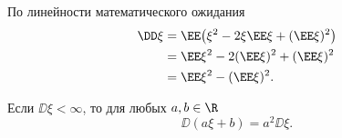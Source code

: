 \begin{Proof}
    По линейности математического ожидания
    \[
        \begin{aligned}
            \DD\xi
            &=\EE\bigl(\xi^2-2\xi\EE\xi+(\EE\xi)^2\bigr)\\
            &=\EE\xi^2-2(\EE\xi)^2+(\EE\xi)^2\\
            &=\EE\xi^2-(\EE\xi)^2.
        \end{aligned}
    \]
\end{Proof}
\begin{theorem}
    Если $\DD\xi<\infty$, то для любых $a,b\in\R$
    \[
        \DD(a\xi+b)=a^2\DD\xi.
    \]
\end{theorem}
\endgroup
